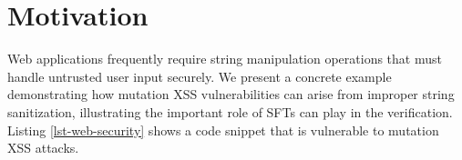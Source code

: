 \section{Motivation}
\label{sec:motivation}

Web applications frequently require string manipulation operations that must handle untrusted user input securely. We present a concrete example demonstrating how mutation XSS vulnerabilities can arise from improper string sanitization, illustrating the important role of SFTs
can play in the verification.
Listing \ref{lst-web-security} shows a code snippet that is vulnerable to mutation XSS attacks.














